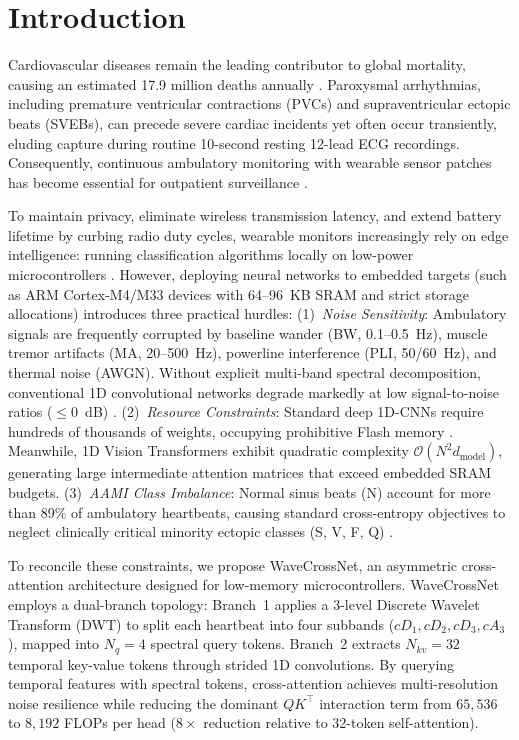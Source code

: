 \documentclass[conference]{IEEEtran}
\begin{document}
\section{Introduction}
\label{sec:intro}

Cardiovascular diseases remain the leading contributor to global mortality, causing an estimated 17.9 million deaths annually \cite{moody2001impact}. Paroxysmal arrhythmias, including premature ventricular contractions (PVCs) and supraventricular ectopic beats (SVEBs), can precede severe cardiac incidents yet often occur transiently, eluding capture during routine 10-second resting 12-lead ECG recordings. Consequently, continuous ambulatory monitoring with wearable sensor patches has become essential for outpatient surveillance \cite{kiranyaz2016real, hong2020mina}.

To maintain privacy, eliminate wireless transmission latency, and extend battery lifetime by curbing radio duty cycles, wearable monitors increasingly rely on edge intelligence: running classification algorithms locally on low-power microcontrollers \cite{satija2018real}. However, deploying neural networks to embedded targets (such as ARM Cortex-M4/M33 devices with 64--96~KB SRAM and strict storage allocations) introduces three practical hurdles:
(1)~\emph{Noise Sensitivity}: Ambulatory signals are frequently corrupted by baseline wander (BW, 0.1--0.5~Hz), muscle tremor artifacts (MA, 20--500~Hz), powerline interference (PLI, 50/60~Hz), and thermal noise (AWGN). Without explicit multi-band spectral decomposition, conventional 1D convolutional networks degrade markedly at low signal-to-noise ratios ($\leq 0$~dB) \cite{addison2005wavelets}.
(2)~\emph{Resource Constraints}: Standard deep 1D-CNNs require hundreds of thousands of weights, occupying prohibitive Flash memory \cite{hannun2019cardiologist}. Meanwhile, 1D Vision Transformers \cite{vaswani2017attention, che2021constrained} exhibit quadratic complexity $\mathcal{O}(N^2 d_{\text{model}})$, generating large intermediate attention matrices that exceed embedded SRAM budgets.
(3)~\emph{AAMI Class Imbalance}: Normal sinus beats (N) account for more than 89\% of ambulatory heartbeats, causing standard cross-entropy objectives to neglect clinically critical minority ectopic classes (S, V, F, Q) \cite{de2004automatic}.

To reconcile these constraints, we propose WaveCrossNet, an asymmetric cross-attention architecture designed for low-memory microcontrollers. WaveCrossNet employs a dual-branch topology: Branch~1 applies a 3-level Discrete Wavelet Transform (DWT) to split each heartbeat into four subbands ($cD_1, cD_2, cD_3, cA_3$), mapped into $N_q=4$ spectral query tokens. Branch~2 extracts $N_{kv}=32$ temporal key-value tokens through strided 1D convolutions. By querying temporal features with spectral tokens, cross-attention achieves multi-resolution noise resilience while reducing the dominant $QK^\top$ interaction term from $65{,}536$ to $8{,}192$ FLOPs per head ($8\times$ reduction relative to 32-token self-attention).
\end{document}

